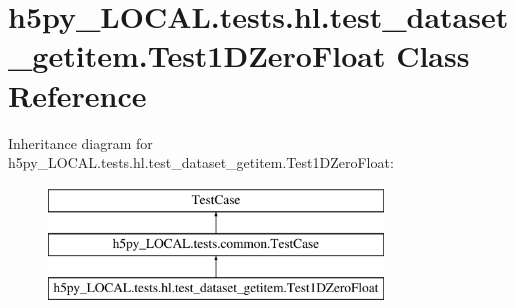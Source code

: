 \hypertarget{classh5py__LOCAL_1_1tests_1_1hl_1_1test__dataset__getitem_1_1Test1DZeroFloat}{}\section{h5py\+\_\+\+L\+O\+C\+A\+L.\+tests.\+hl.\+test\+\_\+dataset\+\_\+getitem.\+Test1\+D\+Zero\+Float Class Reference}
\label{classh5py__LOCAL_1_1tests_1_1hl_1_1test__dataset__getitem_1_1Test1DZeroFloat}
Inheritance diagram for h5py\+\_\+\+L\+O\+C\+A\+L.\+tests.\+hl.\+test\+\_\+dataset\+\_\+getitem.\+Test1\+D\+Zero\+Float\+:\begin{figure}[H]
\begin{center}
\leavevmode
\includegraphics[height=3.000000cm]{classh5py__LOCAL_1_1tests_1_1hl_1_1test__dataset__getitem_1_1Test1DZeroFloat}
\end{center}
\end{figure}
